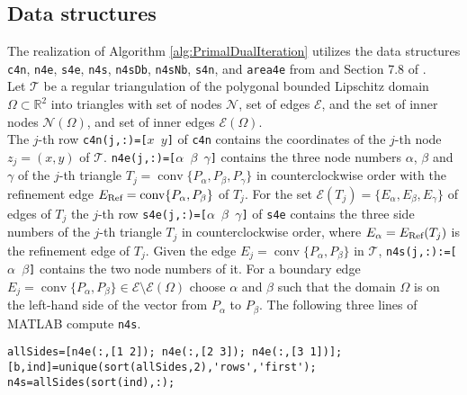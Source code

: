 \subsection{Data structures }
The realization of Algorithm \ref{alg:PrimalDualIteration} utilizes the data
structures \texttt{c4n}, 
\texttt{n4e}, \texttt{s4e}, \texttt{n4s}, \texttt{n4sDb}, \texttt{n4sNb}, \texttt{s4n},
and \texttt{area4e}
from \cite{Carstensen2017script} and Section 7.8 of \cite{CarstensenBrennerFEM}.\\
Let $\mathcal{T}$ be a regular triangulation of the polygonal bounded
Lipschitz domain $\Omega\subset \mathbb R^2$ into triangles with set of nodes
$\mathcal{N}$,
set of edges
$\mathcal{E}$, and the set of inner nodes $\mathcal{N}(\Omega)$, and set of
inner edges
$\mathcal{E}(\Omega)$. \\
The $j$-th row \texttt{c4n(j,:)=[$x$ $y$]} of \texttt{c4n} contains the
coordinates of the $j$-th 
node $z_j=(x,y)$  
of $\mathcal T$.
\texttt{n4e(j,:)=[$\alpha$ $\beta$ $\gamma$]} contains
the three node numbers $\alpha$, $\beta$ and $\gamma$ of the $j$-th triangle 
$T_j=\operatorname{conv}\{P_\alpha,P_\beta,P_\gamma\}$
in counterclockwise order with the refinement edge
$E_\textup{Ref}=\operatorname{conv}
\{P_\alpha,P_\beta\}$
of
$T_j$.
For the set
$\mathcal E(T_j) = \{ E_\alpha,E_\beta,E_\gamma\}$
of edges of $T_j$ the $j$-th row 
\texttt{s4e(j,:)=[$\alpha$ $\beta$ $\gamma$]} 
of \texttt{s4e}
contains
the three side numbers of the $j$-th triangle $T_j$
in counterclockwise order,
where
$E_\alpha=E_\textup{Ref}(T_j)$
is the refinement edge of
$T_j$. 
Given the edge $E_j=\operatorname{conv}\{P_\alpha,P_\beta\}$ in $\mathcal T$,
\texttt{n4s(j,:):=[$\alpha$ $\beta$]} contains
the two node numbers of it.
For a boundary edge
\(E_j = \operatorname*{conv} \{ P_\alpha, P_\beta \}\in\mathcal{E}\setminus\mathcal{E}(\Omega)\)
choose $\alpha$ and $\beta$ such that the domain \(\Omega\) is on the left-hand side
of the vector from \(P_\alpha\) to \(P_\beta\).
The following three lines of MATLAB compute \texttt{n4s}.
\begin{lstlisting}[frame=single,numbers=none]
allSides=[n4e(:,[1 2]); n4e(:,[2 3]); n4e(:,[3 1])];
[b,ind]=unique(sort(allSides,2),'rows','first');
n4s=allSides(sort(ind),:);
\end{lstlisting}
%
